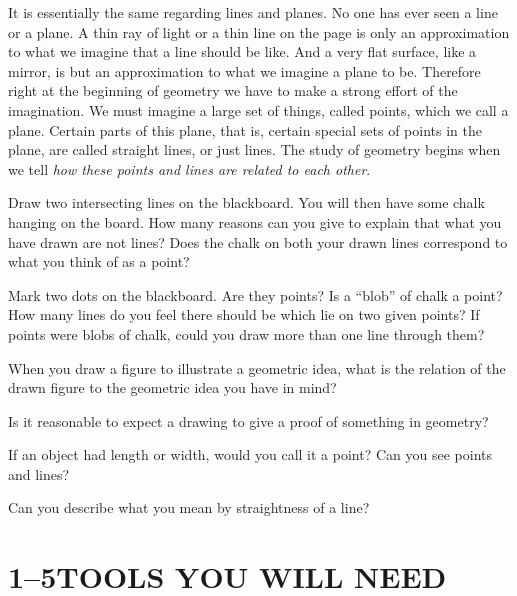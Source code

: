 \documentclass[11pt]{book}
\theoremstyle{bkplain}
\theoremstyle{XIplainnote}
\theoremstyle{bkplain}
\theoremstyle{bkplain}
\begin{document}
It is essentially the same regarding lines and planes. No one has ever seen a
line or a plane. A thin ray of light or a thin line on the page is only an
approximation to what we imagine that a line should be like. And a very flat
surface, like a mirror, is but an approximation to what we imagine a plane to be.
Therefore right at the beginning of geometry we have to make a strong effort of
the imagination. We must imagine a large set of things, called points, which we
call a plane. Certain parts of this plane, that is, certain special sets of
points in the plane, are called straight lines, or just lines. The study of
geometry begins when we tell \emph{how these points and lines are related to each
other}.

\begin{exercisecols}
\begin{exlist}
\item Draw two intersecting lines on the blackboard. You will then have some
      chalk hanging on the board. How many reasons can you give to explain that
      what you have drawn are not lines? Does the chalk on both your drawn lines
      correspond to what you think of as a point?
\item Mark two dots on the blackboard. Are they points? Is a ``blob'' of chalk a
      point? How many lines do you feel there should be which lie on two given
      points? If points were blobs of chalk, could you draw more than one line
      through them?
\item When you draw a figure to illustrate a geometric idea, what is the relation
      of the drawn figure to the geometric idea you have in mind?
\item Is it reasonable to expect a drawing to give a proof of something in
      geometry?
\item If an object had length or width, would you call it a point? Can you see
      points and lines?
\item Can you describe what you mean by straightness of a line?
\end{exlist}
\end{exercisecols}

\section*{1--5\quad TOOLS YOU WILL NEED}
\end{document}
